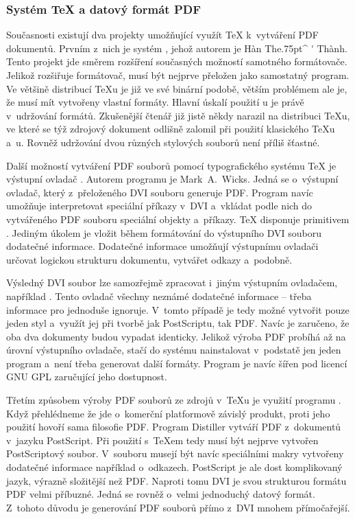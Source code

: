 \documentclass[12pt]{article}
\begin{document}
\subsubsection*{Systém \TeX{} a datový formát PDF}
Současnosti existují dva projekty umožňující využít 
\TeX{} k~vytváření PDF dokumentů. Prvním z~nich je systém \pdfTeX,
jehož autorem je 
H\`an The\kern-5.5pt\lower.75pt\hbox{\^{}}%
\kern-6pt\lower-2pt\hbox{\'{}} Th\`anh.
Tento projekt jde směrem rozšíření současných možností samotného formátovače.
Jelikož \pdfTeX{} rozšiřuje formátovač,
musí být nejprve přeložen jako samostatný program.
Ve většině distribucí \TeX u je již \pdfTeX{} ve své binární podobě,
větším problémem ale je, že musí mít vytvořeny vlastní formáty. 
Hlavní úskalí použití \pdfTeX u je právě v~udržování formátů. Zkušenější čtenář
již jistě někdy narazil na distribuci \TeX u, ve které se týž zdrojový
dokument odlišně zalomil při použití klasického \TeX u a~\pdfTeX u. 
Rovněž udržování dvou různých stylových souborů není příliš šťastné.

\medskip
Další možností vytváření PDF souborů pomocí typografického systému \TeX{}
je výstupní ovladač .
Autorem programu je Mark~A.~Wicks. Jedná se o~výstupní ovladač, 
který z~přeloženého DVI souboru generuje PDF. Program navíc umožňuje 
interpretovat speciální příkazy v~DVI a~vkládat podle nich do vytvářeného
PDF souboru speciální objekty a~příkazy. \TeX{} disponuje primitivem
. Jediným úkolem  je vložit během
formátování do výstupního DVI souboru dodatečné informace. Dodatečné
informace umožňují výstupnímu ovladači  určovat logickou
strukturu dokumentu, vytvářet odkazy a~podobně.

\medskip
Výsledný DVI soubor lze samozřejmě zpracovat
i~jiným výstupním ovladačem, například . Tento ovladač všechny
neznámé dodatečné informace -- třeba informace pro  jednoduše
ignoruje. V~tomto případě je tedy možné vytvořit pouze jeden styl 
a~využít jej při tvorbě jak PostScriptu, tak PDF. Navíc je zaručeno, 
že oba dva dokumenty budou vypadat identicky. Jelikož výroba PDF probíhá
až na úrovní výstupního ovladače, stačí do systému nainstalovat v~podstatě
jen jeden program a~není třeba generovat další formáty.
Program  je navíc šířen pod licencí GNU GPL zaručující jeho
dostupnost.

\medskip
Třetím způsobem výroby PDF souborů ze zdrojů v~\TeX u je využití programu
.
Když přehlédneme že jde o~komerční platformově
závislý produkt, proti jeho použití hovoří sama filosofie PDF. 
Program Distiller vytváří PDF z~dokumentů v~jazyku PostScript. Při použití
s~\TeX em tedy musí být nejprve vytvořen PostScriptový soubor. V~souboru
musejí být navíc speciálními makry vytvořeny dodatečné informace například
o~odkazech. PostScript je ale dost komplikovaný jazyk,
výrazně složitější než PDF.
Naproti tomu DVI je svou strukturou formátu PDF velmi příbuzné. Jedná se rovněž
o~velmi jednoduchý datový formát. 
Z~tohoto důvodu je generování PDF souborů přímo z~DVI mnohem přímočařejší.
\end{document}
